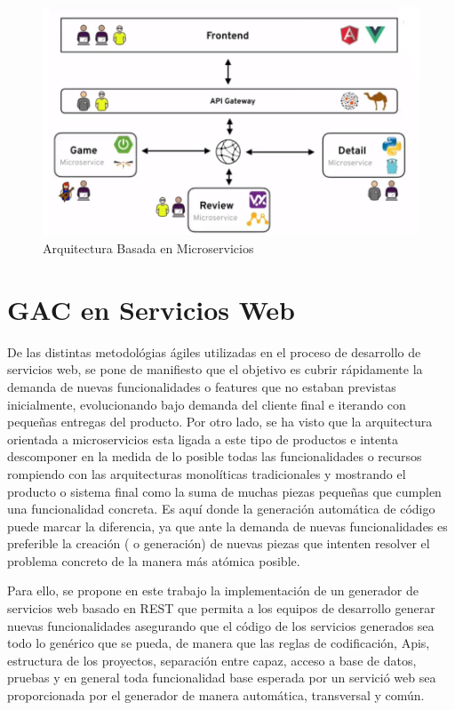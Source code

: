 \documentclass[a4paper,11pt]{book}
\begin{document}
\begin{figure}[H]  
\centering 
\includegraphics[scale=0.35]{imagenes/micro.png}
\caption{ Arquitectura Basada en Microservicios\cite{micro} }  
\end{figure}

\section{GAC en Servicios Web}

De las distintas metodológias ágiles utilizadas en el proceso de desarrollo de servicios web, se pone de manifiesto que el objetivo es cubrir rápidamente la demanda de nuevas funcionalidades o features que no estaban previstas inicialmente, evolucionando bajo demanda del cliente final e iterando con pequeñas entregas del producto. Por otro lado, se ha visto que la arquitectura orientada a microservicios esta ligada a este tipo de productos e intenta descomponer en la medida de lo posible todas las funcionalidades o recursos rompiendo con las arquitecturas monolíticas tradicionales y mostrando el producto o sistema final como la suma de muchas piezas pequeñas que cumplen una funcionalidad concreta. Es aquí donde la generación automática de código puede marcar la diferencia, ya que ante la demanda de nuevas funcionalidades es preferible la creación ( o generación) de nuevas piezas que intenten resolver el problema concreto de la manera más atómica posible. 

Para ello, se propone en este trabajo la implementación de un generador de servicios web basado en REST que permita a los equipos de desarrollo generar nuevas funcionalidades asegurando que el código de los servicios generados sea todo lo genérico que se pueda, de manera que las reglas de codificación, Apis, estructura de los proyectos, separación entre capaz, acceso a base de datos, pruebas y en general toda funcionalidad base esperada por un servició web  sea proporcionada por el generador de manera automática, transversal y común. 
\end{document}
